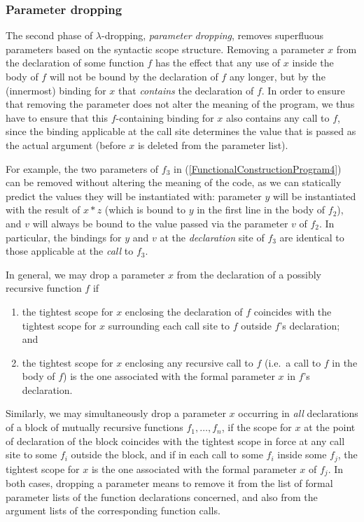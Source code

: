 \subsubsection{Parameter dropping}
\label{section:Part1:Semantics:lambdaDropping:parameterDropping}
The second phase of $\lambda$-dropping, \emph{parameter dropping},
removes superfluous parameters based on the syntactic scope structure.
Removing a parameter $x$ from the declaration of some function $f$ has
the effect that any use of $x$ inside the body of $f$ will not be
bound by the declaration of $f$ any longer, but by the (innermost)
binding for $x$ that \emph{contains} the declaration of $f$. In order
to ensure that removing the parameter does not alter the meaning of
the program, we thus have to ensure that this $f$-containing binding
for $x$ also contains any call to $f$, since the binding applicable at
the call site determines the value that is passed as the actual
argument (before $x$ is deleted from the parameter list).  

For example, the two parameters of $f_3$ in
(\ref{FunctionalConstructionProgram4}) can be removed without altering
the meaning of the code, as we can statically predict the values they
will be instantiated with: parameter $y$ will be instantiated with the
result of $x*z$ (which is bound to $y$ in the first line in the body
of $f_2$), and $v$ will always be bound to the value passed via the
parameter $v$ of $f_2$. In particular, the bindings for $y$ and $v$ at
the \emph{declaration} site of $f_3$ are identical to those applicable
at the \emph{call} to $f_3$.

In general, we may drop a parameter $x$ from the declaration of a
possibly recursive function $f$ if
\begin{enumerate}
\item\label{ParameterDroppingConditionOne} the tightest scope for $x$
  enclosing the declaration of $f$ coincides with the tightest scope
  for $x$ surrounding each call site to $f$ outside $f$'s declaration;
  and
\item\label{ParameterDroppingConditionTwo} the tightest scope for $x$
  enclosing any recursive call to $f$ (i.e.~a call to $f$ in the body
  of $f$) is the one associated with the formal parameter $x$ in $f$'s
  declaration.
\end{enumerate}
Similarly, we may simultaneously drop a parameter $x$ occurring in
\emph{all} declarations of a block of mutually recursive functions
$f_1,\ldots,f_n$, if the scope for $x$ at the point of declaration of
the block coincides with the tightest scope in force at any call site
to some $f_i$ outside the block, and if in each call to some $f_i$
inside some $f_j$, the tightest scope for $x$ is the one associated
with the formal parameter $x$ of $f_j$. In both cases, dropping a
parameter means to remove it from the list of formal parameter lists
of the function declarations concerned, and also from the argument
lists of the corresponding function calls.


